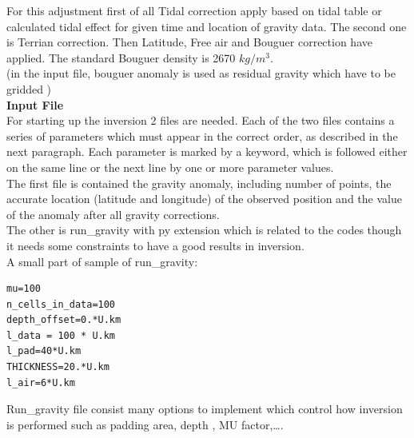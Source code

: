 For this adjustment first of all Tidal correction apply based on tidal table or calculated tidal effect for given time and location of gravity data. The second one is Terrian correction. Then Latitude, Free air and Bouguer correction have applied. The standard Bouguer density is 2670 $kg/m^3$.\\

(in the input file, bouguer anomaly is used as residual gravity  which have to be gridded )\\

\textbf{Input File} \\

For starting up the inversion 2 files are needed. Each of the two files contains a series of parameters which must appear in the correct order, as described in the next paragraph. Each parameter is marked by a keyword, which is followed either on the same line or the next line by one or more parameter values. \\
The first file is contained the gravity anomaly, including number of points, the accurate location (latitude and longitude) of the observed position and the value of the anomaly after all gravity corrections.\\
The other is run_gravity with py extension which is related to the codes though it needs some constraints to have a good results in inversion.\\

A small part of sample of run_gravity:\\
\begin{verbatim}
mu=100
n_cells_in_data=100
depth_offset=0.*U.km
l_data = 100 * U.km
l_pad=40*U.km
THICKNESS=20.*U.km
l_air=6*U.km
\end{verbatim}

Run_gravity file consist many options to implement which control how inversion is performed such as padding area, depth , MU factor,\ldots.

